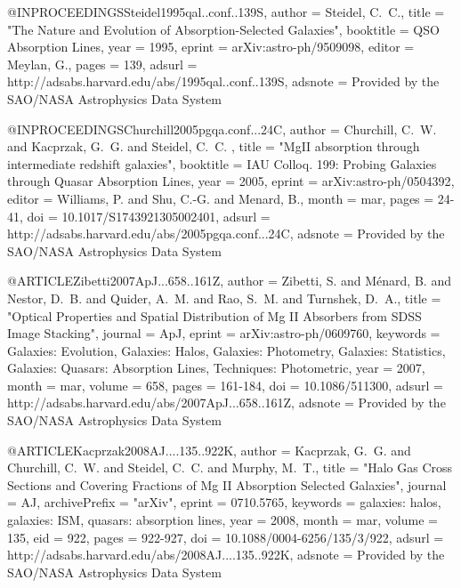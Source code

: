 \documentclass[twocolumn]{aastex62}
\def\aj{{AJ}}\def\actaa{{Acta Astron.}}\def\araa{{ARA\&A}}\def\apj{{ApJ}}\def\apjl{{ApJ}}\def\apjs{{ApJS}}\def\aap{{A\&A}}\def\aapr{{A\&A~Rev.}}\def\aaps{{A\&AS}}\def\apss{{Ap\&SS}}\def\baas{{BAAS}}\def\caa{{Chinese Astron. Astrophys.}}\def\cjaa{{Chinese J. Astron. Astrophys.}}\def\icarus{{Icarus}}\def\jcap{{J. Cosmology Astropart. Phys.}}\def\jrasc{{JRASC}}\def\memras{{MmRAS}}\def\mnras{{MNRAS}}\def\na{{New A}}\def\nar{{New A Rev.}}\def\pra{{Phys.~Rev.~A}}\def\prb{{Phys.~Rev.~B}}\def\prc{{Phys.~Rev.~C}}\def\prd{{Phys.~Rev.~D}}\def\pre{{Phys.~Rev.~E}}\def\prl{{Phys.~Rev.~Lett.}}\def\pasa{{PASA}}\def\pasp{{PASP}}\def\pasj{{PASJ}}
\begin{document}
{{{{{{{{{@INPROCEEDINGS{Steidel1995qal..conf..139S,
   author = {{Steidel}, C.~C.},
    title = "{The Nature and Evolution of Absorption-Selected Galaxies}",
booktitle = {QSO Absorption Lines},
     year = 1995,
   eprint = {arXiv:astro-ph/9509098},
   editor = {{Meylan}, G.},
    pages = {139},
   adsurl = {http://adsabs.harvard.edu/abs/1995qal..conf..139S},
  adsnote = {Provided by the SAO/NASA Astrophysics Data System}
}


@INPROCEEDINGS{Churchill2005pgqa.conf...24C,
   author = {{Churchill}, C.~W. and {Kacprzak}, G.~G. and {Steidel}, C.~C.
	},
    title = "{MgII absorption through intermediate redshift galaxies}",
booktitle = {IAU Colloq. 199: Probing Galaxies through Quasar Absorption Lines},
     year = 2005,
   eprint = {arXiv:astro-ph/0504392},
   editor = {{Williams}, P. and {Shu}, C.-G. and {Menard}, B.},
    month = mar,
    pages = {24-41},
      doi = {10.1017/S1743921305002401},
   adsurl = {http://adsabs.harvard.edu/abs/2005pgqa.conf...24C},
  adsnote = {Provided by the SAO/NASA Astrophysics Data System}
}

@ARTICLE{Zibetti2007ApJ...658..161Z,
   author = {{Zibetti}, S. and {M{\'e}nard}, B. and {Nestor}, D.~B. and {Quider}, A.~M. and 
	{Rao}, S.~M. and {Turnshek}, D.~A.},
    title = "{Optical Properties and Spatial Distribution of Mg II Absorbers from SDSS Image Stacking}",
  journal = {\apj},
   eprint = {arXiv:astro-ph/0609760},
 keywords = {Galaxies: Evolution, Galaxies: Halos, Galaxies: Photometry, Galaxies: Statistics, Galaxies: Quasars: Absorption Lines, Techniques: Photometric},
     year = 2007,
    month = mar,
   volume = 658,
    pages = {161-184},
      doi = {10.1086/511300},
   adsurl = {http://adsabs.harvard.edu/abs/2007ApJ...658..161Z},
  adsnote = {Provided by the SAO/NASA Astrophysics Data System}
}


@ARTICLE{Kacprzak2008AJ....135..922K,
   author = {{Kacprzak}, G.~G. and {Churchill}, C.~W. and {Steidel}, C.~C. and 
	{Murphy}, M.~T.},
    title = "{Halo Gas Cross Sections and Covering Fractions of Mg II Absorption Selected Galaxies}",
  journal = {\aj},
archivePrefix = "arXiv",
   eprint = {0710.5765},
 keywords = {galaxies: halos, galaxies: ISM, quasars: absorption lines},
     year = 2008,
    month = mar,
   volume = 135,
      eid = {922},
    pages = {922-927},
      doi = {10.1088/0004-6256/135/3/922},
   adsurl = {http://adsabs.harvard.edu/abs/2008AJ....135..922K},
  adsnote = {Provided by the SAO/NASA Astrophysics Data System}
}



}}}}}}}}}
\end{document}
